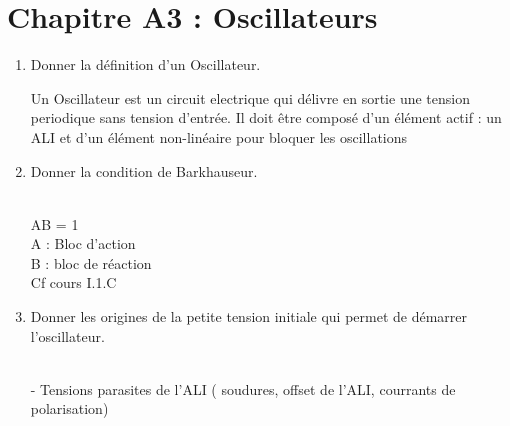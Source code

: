 \section*{\centering Chapitre A3 : Oscillateurs}
\begin{enumerate}[label=\arabic{enumi} - , left=0pt, itemsep=1em] %

    \item Donner la définition d'un Oscillateur. \par
    \begin{solution}
          Un Oscillateur est un circuit electrique qui délivre en sortie une tension periodique sans tension d'entrée. Il doit 
          être composé d'un élément actif : un ALI et d'un élément non-linéaire pour bloquer les oscillations
    \end{solution}

    \item Donner la condition de Barkhauseur. \par
    \begin{solution} \\
        AB = 1\\
        A : Bloc d'action \\
        B : bloc de réaction\\
        Cf cours I.1.C
    \end{solution}

    \item Donner les origines de la petite tension initiale qui permet de démarrer l'oscillateur. \par
    \begin{solution} \\
        - Tensions parasites de l'ALI ( soudures, offset de l'ALI, courrants de polarisation)
    \end{solution}
    
\end{enumerate}


